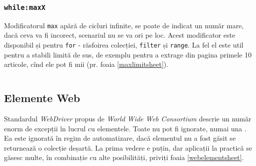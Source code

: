 \subsubsection{\texttt{while:maxX}}

Modificatorul \texttt{max} apără de cicluri infinite, se poate de indicat un număr mare, dacă ceva va fi incorect, scenariul nu se va ori pe loc. Acest modificator este disponibil și pentru \texttt{for} - răsfoirea colecției, \texttt{filter} și \texttt{range}. La fel el este util pentru a stabili limită de sus, de exemplu pentru a extrage din pagina primele 10 articole, cînd ele pot fi mii (pr. foaia \ref{maxlimitsheet}).

\begin{sourcecode}
    \label{maxlimitsheet}
    \inputminted[linenos]{icl}{../sources/maxlimitsheet.icL}
\end{sourcecode}

\subsection{Elemente Web}

Standardul \textit{WebDriver} propus de \textit{World Wide Web Consortium} descrie un număr enorm de excepții în lucrul cu elementele. Toate nu pot fi ignorate, numai una . Ea este ignorată în regim de automatizare, dacă elementul nu a fost găsit se returnează o colecție deșartă. La prima vedere e puțin, dar aplicații la practică se găsesc multe, în combinație cu alte posibilități, priviți foaia \ref{webelementsheet}.

\begin{sourcecode}
    \label{webelementsheet}
    \inputminted[linenos]{icl}{../sources/webelementsheet.icL}
\end{sourcecode}

